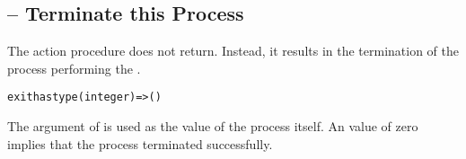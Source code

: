 \subsection{ -- Terminate this Process}
\label{exit}

The  action procedure does not return. Instead, it results in the termination of the process performing the .


\begin{alltt}
exit has type (integer)=>()
\end{alltt}

The argument of  is used as the value of the process itself. An  value of zero implies that the process terminated successfully.
